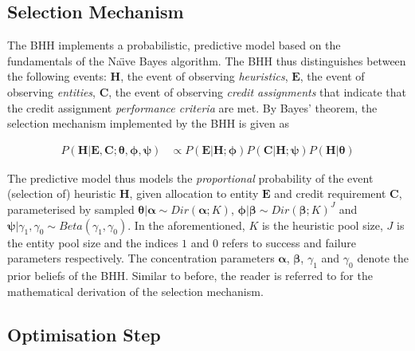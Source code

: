 \subsection{Selection Mechanism}\label{sec:bhh:selection_mechanism}

The \acs{BHH} implements a probabilistic, predictive model based on the fundamentals of the Na\"{\i}ve Bayes algorithm. The \acs{BHH} thus distinguishes between the following events: \textbf{$\boldsymbol{H}$}, the event of observing \textit{heuristics}, \textbf{$\boldsymbol{E}$}, the event of observing \textit{entities}, \textbf{$\boldsymbol{C}$}, the event of observing \textit{credit assignments} that indicate that the credit assignment \textit{performance criteria} are met. By Bayes' theorem, the selection mechanism implemented by the \acs{BHH} is given as

\begin{equation}
	\label{eq:bhh:selection_mechanism:predictive_model_prop_to}
	\begin{split}
		P(\boldsymbol{H} \vert \boldsymbol{E}, \boldsymbol{C}; \boldsymbol{\theta}, \boldsymbol{\phi}, \boldsymbol{\psi}) &\propto P(\boldsymbol{E} \vert \boldsymbol{H}; \boldsymbol{\phi}) P(\boldsymbol{C} \vert \boldsymbol{H}; \boldsymbol{\psi}) P(\boldsymbol{H} \vert \boldsymbol{\theta})
	\end{split}
\end{equation}

The predictive model thus models the \textit{proportional} probability of the event (selection of) heuristic $\boldsymbol{H}$, given allocation to entity $\boldsymbol{E}$ and credit requirement $\boldsymbol{C}$, parameterised by sampled $\boldsymbol{\theta} \vert \boldsymbol{\alpha} \sim Dir(\boldsymbol{\alpha}; K)$, $\boldsymbol{\phi} \vert \boldsymbol{\beta} \sim Dir(\boldsymbol{\beta}; K)^{J}$ and $\boldsymbol{\psi} \vert \gamma_{1}, \gamma_{0}  \sim Beta(\gamma_{1}, \gamma_{0})$. In the aforementioned, $K$ is the heuristic pool size, $J$ is the entity pool size and the indices $1$ and $0$ refers to success and failure parameters respectively. The concentration parameters $\boldsymbol{\alpha}$, $\boldsymbol{\beta}$, $\gamma_{1}$ and $\gamma_{0}$ denote the prior beliefs of the \acs{BHH}. Similar to before, the reader is referred to \cite{ref:schreuder:2022} for the mathematical derivation of the selection mechanism.

\subsection{Optimisation Step}\label{sec:bhh:optimisation_step}

